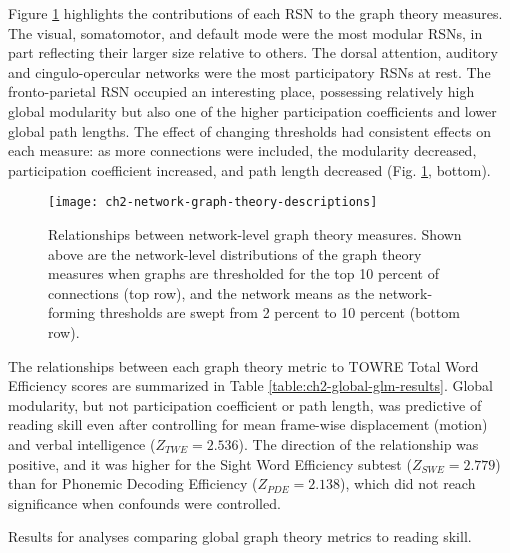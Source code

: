 Figure \ref{fig:ch2-network-graph-theory-descriptions} highlights the contributions of each RSN to the graph theory measures. The visual, somatomotor, and default mode were the most modular RSNs, in part reflecting their larger size relative to others. The dorsal attention, auditory and cingulo-opercular networks were the most participatory RSNs at rest. The fronto-parietal RSN occupied an interesting place, possessing relatively high global modularity but also one of the higher participation coefficients and lower global path lengths. The effect of changing thresholds had consistent effects on each measure: as more connections were included, the modularity decreased, participation coefficient increased, and path length decreased (Fig. \ref{fig:ch2-network-graph-theory-descriptions}, bottom). 

\begin{figure}[t]
    \centering
    \texttt{[image: ch2-network-graph-theory-descriptions]}
    \caption[Relationships between network-level graph theory measures]{Relationships between network-level graph theory measures. Shown above are the network-level distributions of the graph theory measures when graphs are thresholded for the top 10 percent of connections (top row), and the network means as the network-forming thresholds are swept from 2 percent to 10 percent (bottom row).}
    \label{fig:ch2-network-graph-theory-descriptions}
\end{figure}

The relationships between each graph theory metric to TOWRE Total Word Efficiency scores are summarized in Table \ref{table:ch2-global-glm-results}. Global modularity, but not participation coefficient or path length, was predictive of reading skill even after controlling for mean frame-wise displacement (motion) and verbal intelligence ($Z_{TWE} = 2.536$). The direction of the relationship was positive, and it was higher for the Sight Word Efficiency subtest ($Z_{SWE} = 2.779$) than for Phonemic Decoding Efficiency ($Z_{PDE} = 2.138$), which did not reach significance when confounds were controlled. 

\begin{table}[t]
    \renewcommand{\tabcolsep}{0.09cm}
    \centering
    
    \caption[Comparison of global graph theory metrics to reading skill]{Results for analyses comparing global graph theory metrics to reading skill.}
    \label{table:ch2-global-glm-results}
\end{table}

